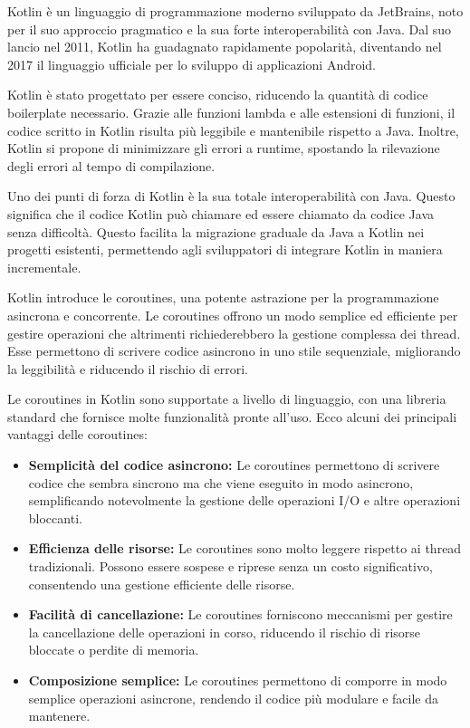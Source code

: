 \documentclass[12pt,a4paper,openright,twoside]{book}
\begin{document}
Kotlin è un linguaggio di programmazione moderno sviluppato da JetBrains, noto per il suo approccio pragmatico e la sua forte interoperabilità con Java. 
Dal suo lancio nel 2011, Kotlin ha guadagnato rapidamente popolarità, diventando nel 2017 il linguaggio ufficiale per lo sviluppo di applicazioni Android. 

Kotlin è stato progettato per essere conciso, riducendo la quantità di codice boilerplate necessario. Grazie alle funzioni lambda e alle estensioni di funzioni, 
il codice scritto in Kotlin risulta più leggibile e mantenibile rispetto a Java. Inoltre, Kotlin si propone di minimizzare gli errori a runtime, 
spostando la rilevazione degli errori al tempo di compilazione.

Uno dei punti di forza di Kotlin è la sua totale interoperabilità con Java. Questo significa che il codice Kotlin può chiamare ed essere chiamato da codice Java senza difficoltà. 
Questo facilita la migrazione graduale da Java a Kotlin nei progetti esistenti, permettendo agli sviluppatori di integrare Kotlin in maniera incrementale.

Kotlin introduce le coroutines, una potente astrazione per la programmazione asincrona e concorrente. Le coroutines offrono un modo semplice ed efficiente per gestire operazioni
che altrimenti richiederebbero la gestione complessa dei thread. Esse permettono di scrivere codice asincrono in uno stile sequenziale, migliorando la leggibilità e
riducendo il rischio di errori.

Le coroutines in Kotlin sono supportate a livello di linguaggio, con una libreria standard che fornisce molte funzionalità pronte all'uso. 
Ecco alcuni dei principali vantaggi delle coroutines:

\begin{itemize}
    \item \textbf{Semplicità del codice asincrono:} Le coroutines permettono di scrivere codice che sembra sincrono ma che viene eseguito in modo asincrono, 
    semplificando notevolmente la gestione delle operazioni I/O e altre operazioni bloccanti.
    \item \textbf{Efficienza delle risorse:} Le coroutines sono molto leggere rispetto ai thread tradizionali. Possono essere sospese e riprese senza un costo significativo, 
    consentendo una gestione efficiente delle risorse.
    \item \textbf{Facilità di cancellazione:} Le coroutines forniscono meccanismi per gestire la cancellazione delle operazioni in corso, 
    riducendo il rischio di risorse bloccate o perdite di memoria.
    \item \textbf{Composizione semplice:} Le coroutines permettono di comporre in modo semplice operazioni asincrone, rendendo il codice più modulare e facile da mantenere.
\end{itemize}
\end{document}
